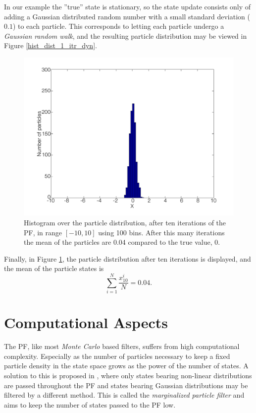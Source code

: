 \documentclass{LTHthesis}
\begin{document}
In our example the ''true'' state is stationary, so the state update consists only of adding a Gaussian distributed random number with a small standard deviation ($0.1$) to each particle. This corresponds to letting each particle undergo a \emph{Gaussian random walk}, and the resulting particle distribution may be viewed in Figure \ref{hist_dist_1_itr_dyn}.
%
\begin{figure}[!hbt]

\includegraphics[width=1\textwidth ]{images/PF/hist_dist_10_itr}
\caption{Histogram over the particle distribution, after ten iterations of the PF, in range $[-10,10]$ using 100 bins. After this many iterations the mean of the particles are 0.04 compared to the true value, 0.}\label{hist_dist_10_itr}
\end{figure}

Finally, in Figure \ref{hist_dist_10_itr}, the particle distribution after ten iterations is displayed, and the mean of the particle states is
\begin{equation}
\sum^{N}_{i=1}{\frac{x^i_{10}}{N}} = 0.04.
\end{equation} 
%
\section{Computational Aspects}
\label{sec:com_asp}
%
The PF, like most \emph{Monte Carlo} based filters, suffers from high computational complexity. Especially as the number of particles necessary to keep a fixed particle density in the state space grows as the power of the number of states. A solution to this is proposed in \cite{gson12}, where only states bearing non-linear distributions are passed throughout the PF and states bearing Gaussian distributions may be filtered by a different method. This is called the \emph{marginalized particle filter} and aims to keep the number of states passed to the PF low. 
\end{document}
